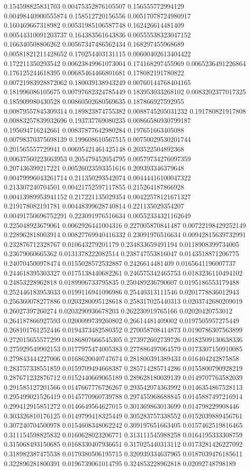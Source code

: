 \begin{table}
\begin{tabu}
\begin{sparkline}{10}
0.154598825831703 0.00475352876105507 0.156555772994129 0.00498440900555874 0.158512720156556 0.00517078724980917 0.160469667318982 0.00531985106587748 0.162426614481409 0.00544310091203737 0.164383561643836 0.00555538323047152 0.166340508806262 0.00567347486562434 0.168297455968689 0.00581821211428652 0.170254403131115 0.00600402613404422 0.172211350293542 0.00623849961073004 0.174168297455969 0.0065236491226864 0.176125244618395 0.00685464466801681 0.178082191780822 0.00721983928872062 0.180039138943249 0.00760144768404165 0.181996086105675 0.00797682324785449 0.183953033268102 0.0083202377017325 0.185909980430528 0.00860502680569635 0.187866927592955 0.00879557845309314 0.189823874755382 0.0088745205031232 0.191780821917808 0.00883257839932696 0.193737769080235 0.00866586930799187 0.195694716242661 0.00837877642980284 0.197651663405088 0.00798370375698139 0.199608610567515 0.00750029530201744 0.201565557729941 0.00695421461425148 0.203522504892368 0.00637560223663953 0.205479452054795 0.00579734276097359 0.207436399217221 0.00526023593351616 0.209393346379648 0.00479996043261714 0.211350293542074 0.00444416100047322 0.213307240704501 0.00421752597117855 0.215264187866928 0.00413989953941152 0.217221135029354 0.00422578121671327 0.219178082191781 0.00448399628740814 0.221135029354207 0.00491750696752291 0.223091976516634 0.00552334321162649 0.225048923679061 0.0062926441004316 0.227005870841487 0.00722198429252149 0.228962818003914 0.00827769940416332 0.23091976516634 0.00942815639732991 0.232876712328767 0.010643279201179 0.234833659491194 0.0118908399734005 0.23679060665362 0.0131378222082514 0.238747553816047 0.0143518871206775 0.240704500978474 0.0155028572532887 0.2426614481409 0.0165641196007737 0.244618395303327 0.0175138440682261 0.246575342465753 0.0183236110494102 0.24853228962818 0.0189906733795835 0.250489236790607 0.0195186553179488 0.252446183953033 0.0199116941096986 0.25440313111546 0.0201778836012943 0.256360078277886 0.0203280095128618 0.258317025440313 0.0203742680209019 0.26027397260274 0.0203290936678203 0.262230919765166 0.02020420753012 0.264187866927593 0.0200099739260802 0.26614481409002 0.0197505957275449 0.268101761252446 0.0194373482580352 0.270058708414873 0.0190786307563899 0.272015655577299 0.0186807666545305 0.273972602739726 0.0182509130638336 0.275929549902153 0.0177975474005383 0.277886497064579 0.0173307150910085 0.279843444227006 0.0168620040747674 0.281800391389433 0.016404242875858 0.283757338551859 0.0159709494668387 0.285714285714286 0.0155800790928219 0.287671232876712 0.0152440669065189 0.289628180039139 0.0149707763582039 0.291585127201566 0.0147667776726267 0.293542074363992 0.0146354867528113 0.295499021526419 0.0145770960739788 0.297455968688845 0.0145887497216914 0.299412915851272 0.0146649564627015 0.301369863013699 0.014798229908446 0.303326810176125 0.0149799418325449 0.305283757338552 0.0152039889456761 0.307240704500978 0.0154608348062242 0.309197651663405 0.0157462519816465 0.311154598825832 0.0160628023206771 0.313111545988258 0.0164195333308759 0.315068493150685 0.0168330407936651 0.317025440313112 0.0173281426227092 0.318982387475538 0.0179380506195715 0.320939334637965 0.0187039476185611 0.322896281800391 0.0196739061014795 0.324853228962818 0.02092748798189 
\end{sparkline}
\end{tabu}
\end{table}
